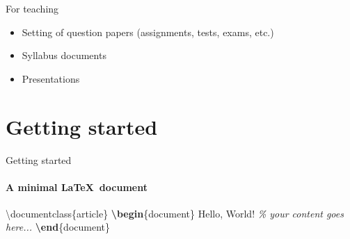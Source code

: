 \documentclass[,aspectratio=43]{beamer}
\newcommand{\VERB}{\Verb[commandchars=\\\{\}]}
\newenvironment{Shaded}{\begin{snugshade}}{\end{snugshade}}
\newcommand{\BuiltInTok}[1]{#1}
\newcommand{\CommentTok}[1]{\textcolor[rgb]{0.38,0.63,0.69}{\textit{#1}}}
\newcommand{\ExtensionTok}[1]{#1}
\newcommand{\KeywordTok}[1]{\textcolor[rgb]{0.00,0.44,0.13}{\textbf{#1}}}
\newcommand{\NormalTok}[1]{#1}
\providecommand{\tightlist}{%
  \setlength{\itemsep}{0pt}\setlength{\parskip}{0pt}}
\begin{document}
\begin{frame}{For teaching}
\begin{itemize}
\tightlist
\item
  Setting of question papers (assignments, tests, exams, etc.)
\item
  Syllabus documents
\item
  Presentations
\end{itemize}
\end{frame}

\hypertarget{getting-started}{%
\section{Getting started}\label{getting-started}}

\begin{frame}[fragile]{Getting started}
\framesubtitle{A minimal \LaTeX\ document}

\begin{Shaded}
\begin{Highlighting}[]
\BuiltInTok{\textbackslash{}documentclass}\NormalTok{\{}\ExtensionTok{article}\NormalTok{\}}
\KeywordTok{\textbackslash{}begin}\NormalTok{\{}\ExtensionTok{document}\NormalTok{\}}
\NormalTok{Hello, World!  }\CommentTok{\% your content goes here...}
\KeywordTok{\textbackslash{}end}\NormalTok{\{}\ExtensionTok{document}\NormalTok{\}}
\end{Highlighting}
\end{Shaded}

\end{frame}
\end{document}
